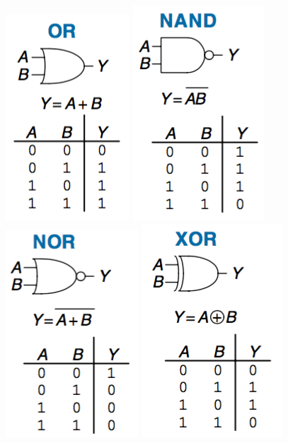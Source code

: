 \documentclass[12pt]{article}
\theoremstyle{definition}
\begin{document}
  \includegraphics[scale=0.7]{pictures/orGate.png}
  \includegraphics[scale=0.7]{pictures/nandGate.png}
  \includegraphics[scale=0.7]{pictures/norGate.png}
  \includegraphics[scale=0.7]{pictures/xorGate.png}
\end{document}
